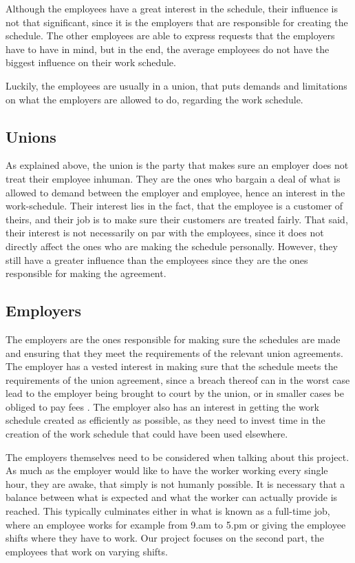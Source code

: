 Although the employees have a great interest in the schedule, their influence is not that significant, since it is the employers that are responsible for creating the schedule. The other employees are able to express requests that the employers have to have in mind, \parencite{industriens_overenskomst} but in the end, the average employees do not have the biggest influence on their work schedule.

Luckily, the employees are usually in a union, that puts demands and limitations on what the employers are allowed to do, regarding the work schedule.  

\subsection{Unions}
As explained above, the union is the party that makes sure an employer does not treat their employee inhuman. They are the ones who bargain a deal of what is allowed to demand between the employer and employee, hence an interest in the work-schedule. Their interest lies in the fact, that the employee is a customer of theirs, and their job is to make sure their customers are treated fairly. That said, their interest is not necessarily on par with the employees, since it does not directly affect the ones who are making the schedule personally. However, they still have a greater influence than the employees since they are the ones responsible for making the agreement.

\subsection{Employers}
The employers are the ones responsible for making sure the schedules are made and ensuring that they meet the requirements of the relevant union agreements. The employer has a vested interest in making sure that the schedule meets the requirements of the union agreement, since a breach thereof can in the worst case lead to the employer being brought to court by the union, or in smaller cases be obliged to pay fees \parencite{overenskomstbrud}. The employer also has an interest in getting the work schedule created as efficiently as possible, as they need to invest time in the creation of the work schedule that  could have been used elsewhere. 

The employers themselves need to be considered when talking about this project. As much as the employer would like to have the worker working every single hour, they are awake, that simply is not humanly possible. It is necessary that a balance between what is expected and what the worker can actually provide is reached. This typically culminates either in what is known as a full-time job, where an employee works for example from 9.am to 5.pm or giving the employee shifts where they have to work. Our project focuses on the second part, the employees that work on varying shifts.  %

